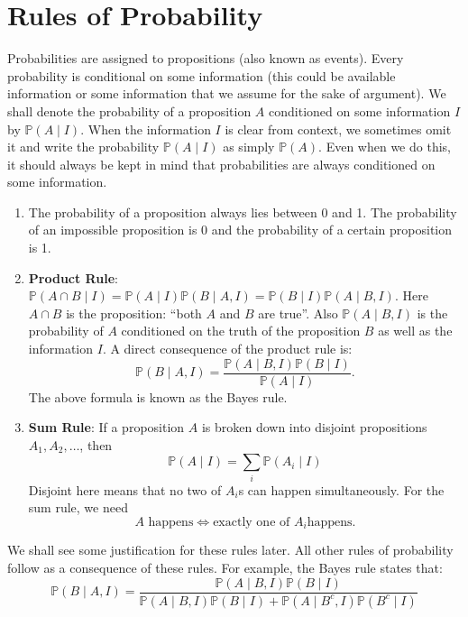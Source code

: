 \documentclass{scrartcl}
\newcommand{\P}{{\mathbb P}}
\begin{document}
\section{Rules of Probability}
Probabilities are assigned to propositions (also known as
events). Every probability is conditional on some information (this
could be available information or some information that we assume for
the sake of argument). We shall denote the probability of a
proposition $A$ conditioned on some information $I$ by $\P(A \mid
I)$. When the information $I$ is clear from context, we sometimes omit
it and write the probability $\P(A \mid I)$ as simply $\P(A)$. Even
when we do this, it should always be kept in mind that probabilities
are always conditioned on some information. 
\begin{enumerate}
\item The probability of a proposition always lies between 0 and
  1. The probability of an impossible proposition is 0 and the
  probability of a certain proposition is 1.
\item \textbf{Product Rule}: $\P(A \cap B \mid I) = \P(A \mid I) \P(B
  \mid A, I) =
  \P(B \mid I) \P(A \mid B, I)$. Here $A \cap B$ is the proposition: ``both $A$
  and $B$ are true''. Also $\P(A \mid B, I)$ is the probability of $A$
  conditioned on the truth of the proposition $B$ as well as the
  information $I$. A direct consequence of the product rule is:
  \begin{equation*}
    \P(B \mid A, I) = \frac{\P(A \mid B, I) \P(B \mid I)}{\P(A \mid
      I)}. 
  \end{equation*}
  The above formula is known as the Bayes rule. 
\item \textbf{Sum Rule}: If a proposition $A$ is broken down into
  disjoint propositions $A_1, A_2, \dots$, then
  \begin{equation*}
    \P(A \mid I) = \sum_{i}\P(A_i \mid I)
  \end{equation*}
  Disjoint here means that no two of $A_i$s can happen
  simultaneously. For the sum rule, we need
  \begin{equation*}
    A \text{ happens} \Leftrightarrow \text{exactly one of } A_i \text{
      happens}. 
  \end{equation*}
\end{enumerate}
We shall see some justification for these rules later. All other rules
of probability follow as a consequence of these rules. For example,
the Bayes rule states that:
\begin{equation*}
  \P\left(B \mid A, I \right) = \frac{\P\left(A \mid B, I \right) \P
    \left(B \mid I \right)}{\P\left(A \mid B, I \right) \P
    \left(B \mid I \right) + \P\left(A \mid B^c, I \right) \P
    \left(B^c \mid I \right)}
\end{equation*}
\end{document}
